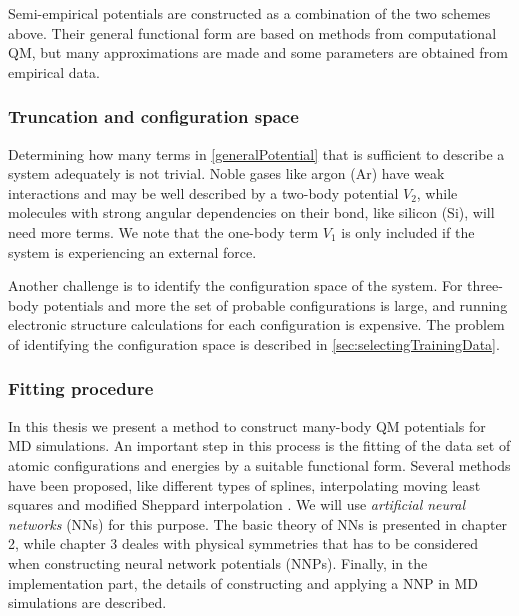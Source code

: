 \documentclass[twoside,english]{uiofysmaster}
\begin{document}
Semi-empirical potentials are constructed as a combination of the two schemes above. Their general functional form
are based on methods from computational QM, but many approximations are made and some parameters are obtained from empirical data. 

\subsubsection{Truncation and configuration space}
Determining how many terms in \eqref{generalPotential} that is sufficient to 
describe a system adequately is not trivial. Noble gases like argon (Ar) have weak interactions and 
may be well described by a two-body potential $V_2$, while molecules with strong angular dependencies on their bond, like
silicon (Si), will need more terms. We note that the one-body term $V_1$ is only included if the system 
is experiencing an external force. 

Another challenge is to identify the
configuration space of the system. For three-body potentials and more the set of probable configurations is large, and 
running electronic structure calculations for each configuration is expensive. The problem of identifying the configuration
space is described in \autoref{sec:selectingTrainingData}. 

\subsubsection{Fitting procedure}
In this thesis we present a method to construct many-body QM potentials for MD simulations.
An important step in this process is the fitting of the data set of atomic configurations and energies by 
a suitable functional form. Several methods have been proposed, like different types of splines, 
interpolating moving least squares \cite{Dawes08} and modified Sheppard interpolation \cite{Ischtwan94}. 
We will use \textit{artificial neural networks} (NNs) for this purpose. 
The basic theory of NNs is presented in chapter 2, while chapter 3 deales with physical symmetries that has to be considered
when constructing neural network potentials (NNPs). 
Finally, in the implementation part, the details of constructing and applying a NNP in MD simulations are described. 
\end{document}
